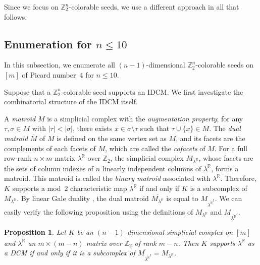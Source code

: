 \documentclass[11pt]{amsart}
\theoremstyle{plain}
\newtheorem{proposition}[theorem]{Proposition}
\numberwithin{equation}{section}
\theoremstyle{definition}
\newcommand{\R}{\mathbb{R}}
\newcommand{\Z}{\mathbb{Z}}
\begin{document}
Since we focus on $\Z_2^n$-colorable seeds, we use a different approach in all that follows.

\subsection{Enumeration for $n \leq 10$}\label{method:kernel}
In this subsection, we enumerate all $(n-1)$-dimensional $\Z_2^n$-colorable seeds on $[m]$ of Picard number~$4$ for $n\leq 10$.


Suppose that a $\Z_2^n$-colorable seed supports an IDCM.
We first investigate the combinatorial structure of the IDCM itself.

A \emph{matroid} $M$ is a simplicial complex with the \emph{augmentation property}; for any $\tau, \sigma \in M$ with $|\tau| < |\sigma|$, there exists $x \in \sigma \setminus \tau$ such that $\tau \cup \{x\} \in M$.
The \emph{dual matroid} $\overline{M}$ of $M$ is defined on the same vertex set as $M$, and its facets are the complements of each facets of $M$, which are called the \emph{cofacets} of $M$.
For a full row-rank $n \times m$ matrix $\lambda^\R$ over $\Z_2$, the simplicial complex $M_{\lambda^\R}$, whose facets are the sets of column indexes of $n$ linearly independent columns of $\lambda^\R$, forms a matroid.
This matroid is called the \emph{binary matroid} associated with $\lambda^\R$.
Therefore, $K$ supports a mod~$2$ characteristic map $\lambda^\R$ if and only if $K$ is a subcomplex of $M_{\lambda^\R}$.
By linear Gale duality \cite{ewald1996combinatorial}, the dual matroid $\overline{M_{\lambda^\R}}$ is equal to $M_{\overline{\lambda^\R}^t}$.
We can easily verify the following proposition using the definitions of $M_{\lambda^\R}$ and $M_{\overline{\lambda^\R}^t}$.

\begin{proposition}\label{prop:linear matroid}
	Let $K$ be an $(n-1)$-dimensional simplicial complex on $[m]$ and $\overline{\lambda^\R}$ an $m \times (m-n)$ matrix over $\Z_2$ of rank $m-n$.
	Then $K$ supports $\overline{\lambda^\R}$ as a DCM if and only if it is a subcomplex of $\overline{M_{\overline{\lambda^\R}^t}} =M_{\lambda^\R}$.
\end{proposition}
\end{document}
